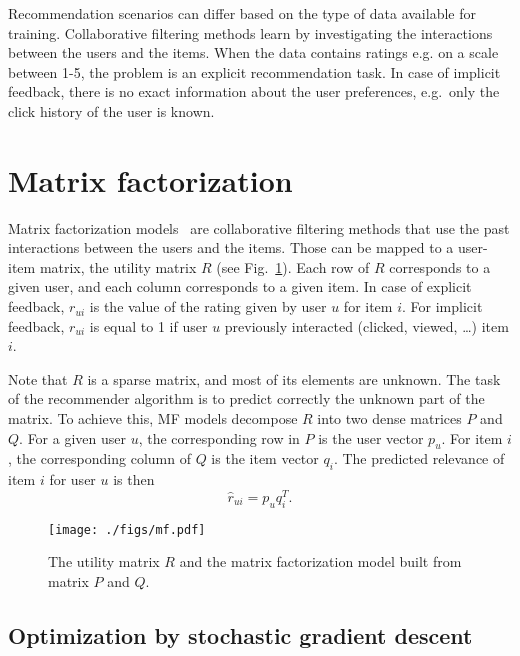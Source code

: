 \documentclass[10pt]{article}
\begin{document}
Recommendation scenarios can differ based on the type of data available for training.
Collaborative filtering methods learn by investigating the interactions between the users and the items.
When the data contains ratings e.g. on a scale between 1-5, the problem is an explicit recommendation task.
In case of implicit feedback, there is no exact information about the user preferences, e.g.\ only the click history of the user is known. 

\section{Matrix factorization}
\label{sec:mf}

Matrix factorization models~\cite{koren2009matrix} are collaborative filtering methods that use the past interactions between the users and the items.
Those can be mapped to a user-item matrix, the utility matrix $R$ (see Fig.~\ref{fig:utility-matrix}).
Each row of $R$ corresponds to a given user, and each column corresponds to a given item.
In case of explicit feedback, $r_{ui}$ is the value of the rating given by user $u$ for item $i$.
For implicit feedback, $r_{ui}$ is equal to 1 if user $u$ previously interacted (clicked, viewed, \ldots) item $i$.

Note that $R$ is a sparse matrix, and most of its elements are unknown.
The task of the recommender algorithm is to predict correctly the unknown part of the matrix.
To achieve this, MF models decompose $R$ into two dense matrices $P$ and $Q$.
For a given user $u$, the corresponding row in $P$ is the user vector $p_u$.
For item $i$, the corresponding column of $Q$ is the item vector $q_i$.
The predicted relevance of item $i$ for user $u$ is then
\begin{equation}
	\hat{r}_{ui} = p_u q_i^T.
\end{equation}

\begin{figure}
\centering
\texttt{[image: ./figs/mf.pdf]}
\caption{The utility matrix $R$ and the matrix factorization model built from matrix $P$ and $Q$.}
\label{fig:utility-matrix}
\end{figure}

\subsection{Optimization by stochastic gradient descent}
\end{document}
